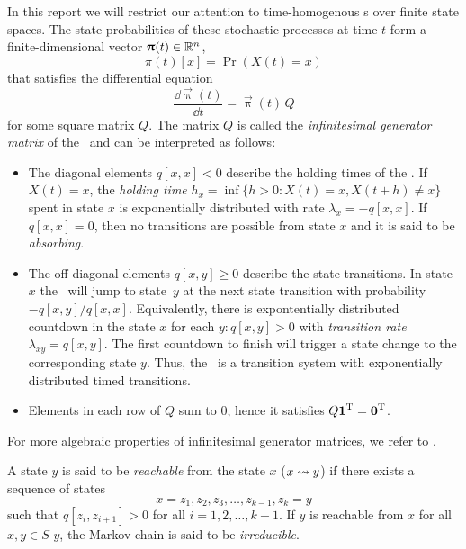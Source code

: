 In this report we will restrict our attention to time-homogenous \CTMC
s over finite state spaces. The state probabilities of these
stochastic processes at time $t$ form a finite-dimensional vector
$\bm{\mathrm{\uppi}}(t) \in \mathbb{R}^n$,
\begin{equation}
  \pi(t)[x] = \Pr(X(t) = x)
\end{equation}
that satisfies the differential equation
\begin{equation}
  \label{eq:background:ctmc:diffeq}
  \frac{\dd \vec{\uppi}(t)}{\dd t} = \vec{\uppi}(t) \, Q
\end{equation}
for some square matrix $Q$. The matrix $Q$ is called the
\emph{infinitesimal generator matrix} of the \CTMC\ and can be
interpreted as follows:
\begin{itemize}
\item The diagonal elements $q[x, x] < 0$ describe the holding times
  of the \CTMC. If $X(t) = x$, the \emph{holding time}
  $h_x = \inf \{ h > 0 : X(t) = x, X(t + h) \ne x \}$ spent in state $x$ is
  exponentially distributed with rate $\lambda_x = -q[x, x]$. If
  $q[x, x] = 0$, then no transitions are possible from state $x$ and
  it is said to be \emph{absorbing}.
\item The off-diagonal elements $q[x, y] \ge 0$ describe the state
  transitions. In state~$x$ the \CTMC\ will jump to state~$y$ at the
  next state transition with probability $-q[x, y] / q[x, x]$.
  Equivalently, there is expontentially distributed countdown in the
  state $x$ for each $y : q[x, y] > 0$ with \emph{transition rate}
  $\lambda_{xy} = q[x, y]$. The first countdown to finish will trigger
  a state change to the corresponding state $y$. Thus, the \CTMC\ is a
  transition system with exponentially distributed timed transitions.
\item Elements in each row of $Q$ sum to $0$, hence it satisfies
  $Q \bm{\mathrm{1}}^{\mathrm{T}} = \bm{\mathrm{0}}^{\mathrm{T}}$.
\end{itemize}

For more algebraic properties of infinitesimal generator matrices, we
refer to \citet{plemmons1979nonnegative,stewart1994introduction}.

A state $y$ is said to be \emph{reachable} from the state $x$
($x \leadsto y$) if there exists a sequence of states
\begin{equation}
  x = z_1, z_2, z_3, \ldots, z_{k - 1}, z_k = y
\end{equation}
such that $q[z_i, z_{i + 1}] > 0$ for all $i = 1, 2, \ldots, k -
1$.
If $y$ is reachable from $x$ for all $x, y \in S$ $y$, the Markov chain
is said to be \emph{irreducible}.

